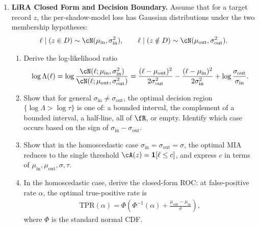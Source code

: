 \documentclass[12pt]{article}
\begin{document}
\begin{enumerate}

\item \textbf{LiRA Closed Form and Decision Boundary.}
Assume that for a target record $z$, the per-shadow-model loss has Gaussian distributions under the two membership hypotheses:
\begin{align*}
    \ell \mid (z \in D) \sim \cN(\mu_{\mathrm{in}}, \sigma_{\mathrm{in}}^2), \qquad \ell \mid (z \notin D) \sim \cN(\mu_{\mathrm{out}}, \sigma_{\mathrm{out}}^2).
\end{align*}
\begin{enumerate}
    \item Derive the log-likelihood ratio
    \begin{align*}
        \log \Lambda(\ell) = \log \frac{\cN(\ell ; \mu_{\mathrm{in}}, \sigma_{\mathrm{in}}^2)}{\cN(\ell ; \mu_{\mathrm{out}}, \sigma_{\mathrm{out}}^2)} = \frac{(\ell - \mu_{\mathrm{out}})^2}{2\sigma_{\mathrm{out}}^2} - \frac{(\ell - \mu_{\mathrm{in}})^2}{2\sigma_{\mathrm{in}}^2} + \log\frac{\sigma_{\mathrm{out}}}{\sigma_{\mathrm{in}}}.
    \end{align*}

    \item Show that for general $\sigma_{\mathrm{in}} \ne \sigma_{\mathrm{out}}$, the optimal decision region $\{\log \Lambda > \log \tau\}$ is one of: a bounded interval, the complement of a bounded interval, a half-line, all of $\fR$, or empty. Identify which case occurs based on the sign of $\sigma_{\mathrm{in}} - \sigma_{\mathrm{out}}$.

    \item Show that in the homoscedastic case $\sigma_{\mathrm{in}} = \sigma_{\mathrm{out}} = \sigma$, the optimal MIA reduces to the single threshold $\cA(z) = \mathbf{1}[\ell \le c]$, and express $c$ in terms of $\mu_{\mathrm{in}}, \mu_{\mathrm{out}}, \sigma, \tau$.

    \item In the homoscedastic case, derive the closed-form ROC: at false-positive rate $\alpha$, the optimal true-positive rate is
    \begin{align*}
        \mathrm{TPR}(\alpha) = \Phi\!\left(\Phi^{-1}(\alpha) + \frac{\mu_{\mathrm{out}} - \mu_{\mathrm{in}}}{\sigma}\right),
    \end{align*}
    where $\Phi$ is the standard normal CDF.
\end{enumerate}


\end{enumerate}
\end{document}
